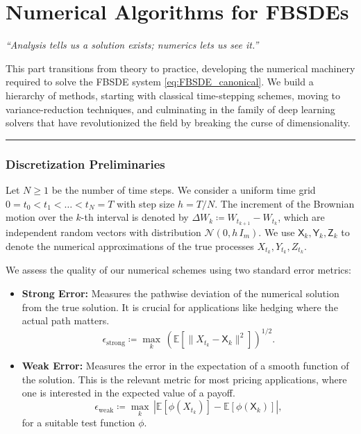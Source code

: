 \clearpage
\newpage
\part{Numerical Algorithms for FBSDEs}
\label{part:numerics}

\begin{center}
\textit{“Analysis tells us a solution exists; numerics lets us see it.”}
\end{center}

This part transitions from theory to practice, developing the numerical machinery required to solve the FBSDE system \eqref{eq:FBSDE_canonical}. We build a hierarchy of methods, starting with classical time-stepping schemes, moving to variance-reduction techniques, and culminating in the family of deep learning solvers that have revolutionized the field by breaking the curse of dimensionality.

\bigskip
\hrule
\bigskip

\section{Discretization Preliminaries}
\label{sec:discrete_notation}

\begin{definition}
Let \(N \ge 1\) be the number of time steps. We consider a uniform time grid \(0=t_0<t_1<\dots<t_N=T\) with step size \(h = T/N\). The increment of the Brownian motion over the \(k\)-th interval is denoted by \(\Delta W_k \coloneqq W_{t_{k+1}}-W_{t_k}\), which are independent random vectors with distribution \(\mathcal N(0,h\,I_m)\). We use \(\mathsf{X}_k, \mathsf{Y}_k, \mathsf{Z}_k\) to denote the numerical approximations of the true processes \(X_{t_k}, Y_{t_k}, Z_{t_k}\).
\end{definition}

\begin{definition}
We assess the quality of our numerical schemes using two standard error metrics:
\begin{itemize}
    \item \textbf{Strong Error:} Measures the pathwise deviation of the numerical solution from the true solution. It is crucial for applications like hedging where the actual path matters.
    \[
      \epsilon_{\mathrm{strong}} \coloneqq \max_{k}\, \left( \mathbb{E}\left[ \|X_{t_k}-\mathsf{X}_k\|^2 \right] \right)^{1/2}.
    \]
    \item \textbf{Weak Error:} Measures the error in the expectation of a smooth function of the solution. This is the relevant metric for most pricing applications, where one is interested in the expected value of a payoff.
    \[
      \epsilon_{\mathrm{weak}} \coloneqq \max_{k}\, \left| \mathbb{E}\left[\phi(X_{t_k})\right] - \mathbb{E}\left[\phi(\mathsf{X}_k)\right] \right|,
    \]
    for a suitable test function \(\phi\).
\end{itemize}
\end{definition}

